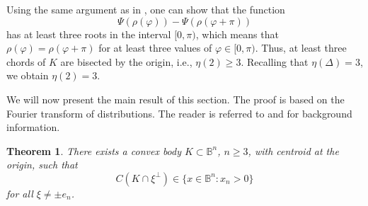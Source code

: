 \documentclass[12pt,letterpaper,reqno]{amsart}
\newtheorem{theorem}{Theorem}
\theoremstyle{definition}
\begin{document}
Using the same argument as in \cite[Section~2]{MTY2}, one can show that the function $$ \Psi(\rho(\varphi)) - \Psi(\rho(\varphi+\pi))$$
has at least three roots in the interval $[0,\pi)$, which means that $\rho(\varphi) = \rho(\varphi+\pi)$ for at least three values of $\varphi\in [0,\pi)$. Thus, at least three chords of $K$ are bisected by the origin, i.e., $\eta(2)\ge 3$. Recalling that $\eta(\Delta)= 3$, we obtain $\eta(2)=3$.



 
 

We will now present the main result of this section. The proof is based on the Fourier transform of distributions. The reader is referred to \cite{GS} and \cite{K} for background information. 



\begin{theorem}\label{Main:H}
	There exists a convex body $K \subset \mathbb{B}^n$,  $n \geq 3$, with  centroid at the origin, such that 
		$$
 C(K \cap \xi^{\perp})\in\{x\in \mathbb B^n: x_n>0\}
	$$
for all $\xi \ne \pm e_n$.
\end{theorem}
\end{document}
